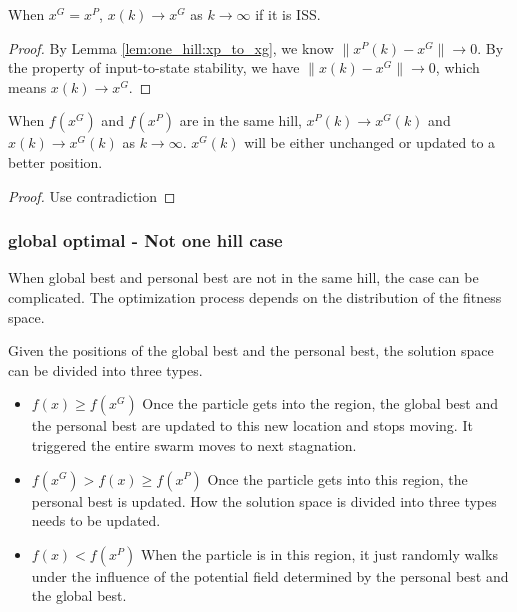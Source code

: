 \begin{lemma}
When $  x^{G} = x^{P} $, $ x(k) \rightarrow x^{G} $ as $ k \rightarrow \infty $ if it is ISS.
\begin{proof}
By Lemma \ref{lem:one_hill:xp_to_xg}, we know $ \lVert x^{P}(k) - x^{G} \rVert \rightarrow 0 $.
By the property of input-to-state stability, we have $ \lVert x(k) - x^{G} \rVert \rightarrow 0 $, which means
$ x(k) \rightarrow x^{G} $.
\end{proof}
\end{lemma}

\begin{theorem}
When $ f(x^{G}) $ and $ f(x^{P}) $ are in the same hill, $ x^{P}(k) \rightarrow x^{G}(k) $ and $ x(k) \rightarrow x^{G}(k) $ as $ k \rightarrow \infty $.
$ x^{G}(k) $ will be either unchanged or updated to a better position.
\begin{proof}
Use contradiction
\end{proof}
\end{theorem}

\subsubsection{global optimal - Not one hill case}

When global best and personal best are not in the same hill, the case can be complicated.
The optimization process depends on the distribution of the fitness space.

Given the positions of the global best and the personal best, the solution space can be divided into three types.
\begin{itemize}
\item $ f(x) \geq f(x^{G}) $ Once the particle gets into the region, the global best and the personal best are updated to this new location and stops moving.
It triggered the entire swarm moves to next stagnation.
\item $ f(x^{G}) > f(x) \geq f(x^{P}) $ Once the particle gets into this region, the personal best is updated. 
How the solution space is divided into three types needs to be updated.
\item $ f(x) < f(x^{P}) $ When the particle is in this region, it just randomly walks under the influence of the potential field determined by the personal best and the global best.
\end{itemize}



